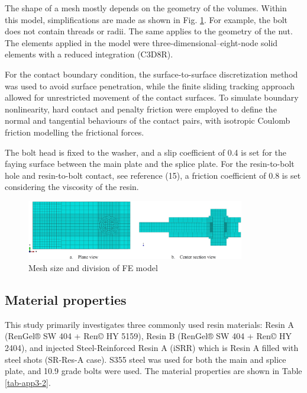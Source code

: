 The shape of a mesh mostly depends on the geometry of the volumes. Within this model, simplifications are made as shown in Fig. \ref{fig-mesh-div-RIBJ}. For example, the bolt does not contain threads or radii. The same applies to the geometry of the nut. The elements applied in the model were three-dimensional--eight-node solid elements with a reduced integration (C3D8R). 

For the contact boundary condition, the surface-to-surface discretization method was used to avoid surface penetration, while the finite sliding tracking approach allowed for unrestricted movement of the contact surfaces. To simulate boundary nonlinearity, hard contact and penalty friction were employed to define the normal and tangential behaviours of the contact pairs, with isotropic Coulomb friction modelling the frictional forces.

The bolt head is fixed to the washer, and a slip coefficient of 0.4 is set for the faying surface between the main plate and the splice plate. For the resin-to-bolt hole and resin-to-bolt contact, see reference (15), a friction coefficient of 0.8 is set considering the viscosity of the resin.

\begin{figure}[htbp]
    \centering
    \includegraphics[width=0.85\textwidth]{imgs/app3/mesh-div-RIBJ.png}
    \caption{Mesh size and division of FE model}
    \label{fig-mesh-div-RIBJ}
\end{figure}

\subsection{Material properties}

This study primarily investigates three commonly used resin materials: Resin A (RenGel® SW 404 + Ren© HY 5159), Resin B (RenGel® SW 404 + Ren© HY 2404), and injected Steel-Reinforced Resin A (\ac{iSRR}) which is Resin A filled with steel shots (SR-Res-A case). S355 steel was used for both the main and splice plate, and 10.9 grade bolts were used. The material properties are shown in Table \ref{tab-app3-2}.

